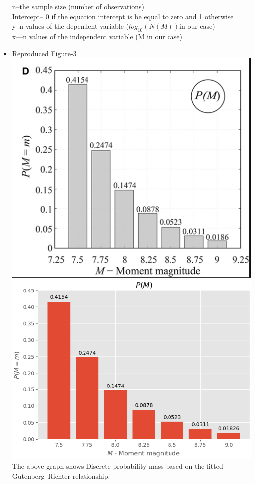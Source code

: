 \documentclass{article}
\begin{document}
\begin{itemize}
n–the sample size (number of observations)\\
Intercept– 0 if the equation intercept is be equal to zero and 1 otherwise\\
y–n values of the dependent variable ($log_{10}(N(M))$in our case)\\
x—n values of the independent variable (M in our case)\\
\newpage
\item Reproduced Figure-3\\
 \includegraphics[scale=0.5]{P(M).PNG} \includegraphics[scale=0.5]{plot_d.png}\\
 The above graph shows  Discrete probability mass based on the fitted Gutenberg–Richter relationship.\cite{cite3}
\end{itemize}
\end{document}
